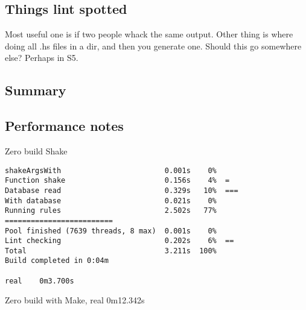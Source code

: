 \subsection{Things lint spotted}


Most useful one is if two people whack the same output. Other thing is where
doing all .hs files in a dir, and then you generate one. Should this go
somewhere else? Perhaps in S5.

\subsection{Summary}





\subsection{Performance notes}

Zero build Shake

\begin{lstlisting}
shakeArgsWith                        0.001s    0%
Function shake                       0.156s    4%  =
Database read                        0.329s   10%  ===
With database                        0.021s    0%
Running rules                        2.502s   77%  =========================
Pool finished (7639 threads, 8 max)  0.001s    0%
Lint checking                        0.202s    6%  ==
Total                                3.211s  100%
Build completed in 0:04m

real    0m3.700s
\end{lstlisting}

Zero build with Make, real    0m12.342s

